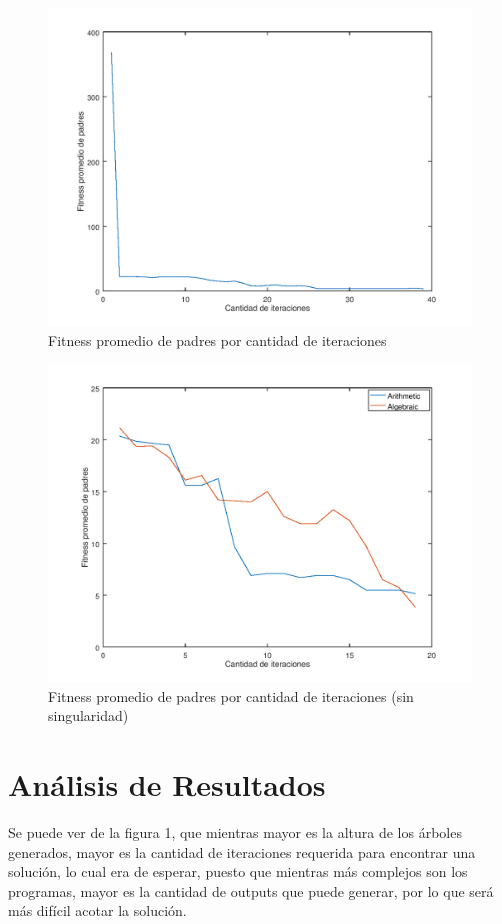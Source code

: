 \documentclass[11pt,letterpaper]{article}
\begin{document}
\clearpage

\begin{figure}[ht!]
\centering \includegraphics[width=\textwidth]{img/fitness.png}
\caption{Fitness promedio de padres por cantidad de iteraciones} \label{img2}
\end{figure}

\clearpage
\begin{figure}[ht!]
\centering \includegraphics[width=\textwidth]{img/comp.png}
\caption{Fitness promedio de padres por cantidad de iteraciones (sin singularidad)} \label{img3}
\end{figure}
\clearpage

\section{Análisis de Resultados}
Se puede ver de la figura 1, que mientras mayor es la altura de los árboles generados, mayor es la 
cantidad de iteraciones requerida para encontrar una solución, lo cual era de esperar, puesto que 
mientras más complejos son los programas, mayor es la cantidad de outputs que puede generar, por lo que será más difícil acotar la solución.\\
\end{document}
